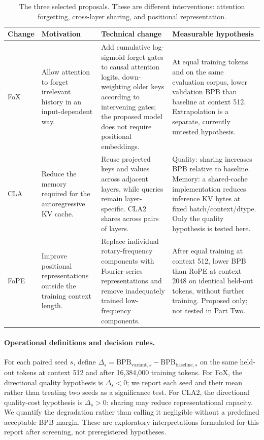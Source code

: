 \documentclass[11pt]{article}
\begin{document}
\begin{table}[htbp]
\centering
\footnotesize
\renewcommand{\arraystretch}{1.15}
\begin{tabularx}{\linewidth}{@{}p{1.7cm}XXX@{}}
\hline
Change & Motivation & Technical change & Measurable hypothesis\\
\hline
FoX~\cite{fox} & Allow attention to forget irrelevant history in an
input-dependent way. & Add cumulative log-sigmoid forget gates to causal
attention logits, down-weighting older keys according to intervening gates;
the proposed model does not require positional embeddings.
& At equal training tokens and on the same evaluation corpus, lower
validation BPB than baseline at context 512. Extrapolation is a separate,
currently untested hypothesis.\\
\hline
CLA~\cite{cla} & Reduce the memory required for the autoregressive KV cache.
& Reuse projected keys and values across adjacent layers, while queries
remain layer-specific. CLA2 shares across pairs of layers.
& Quality: sharing increases BPB relative to baseline. Memory: a shared-cache
implementation reduces inference KV bytes at fixed batch/context/dtype.
Only the quality hypothesis is tested here.\\
\hline
FoPE~\cite{fope} & Improve positional representations outside the training
context length. & Replace individual rotary-frequency components with
Fourier-series representations and remove inadequately trained low-frequency
components. & After equal training at context 512, lower BPB than RoPE
at context 2048 on identical held-out tokens, without further training.
Proposed only; not tested in Part Two.\\
\hline
\end{tabularx}
\caption{The three selected proposals. These are different interventions:
attention forgetting, cross-layer sharing, and positional representation.}
\label{tab:proposals}
\end{table}

\paragraph{Operational definitions and decision rules.}
For each paired seed $s$, define
$\Delta_s=\mathrm{BPB}_{\mathrm{variant},s}-\mathrm{BPB}_{\mathrm{baseline},s}$
on the same held-out tokens at context 512 and after 16,384,000 training
tokens. For FoX, the directional quality hypothesis is $\Delta_s<0$;
we report each seed and their mean rather than treating two seeds as a
significance test. For CLA2, the directional quality-cost hypothesis is
$\Delta_s>0$: sharing may reduce representational capacity. We quantify
the degradation rather than calling it negligible without a predefined
acceptable BPB margin. These are exploratory interpretations formulated
for this report after screening, not preregistered hypotheses.
\end{document}
